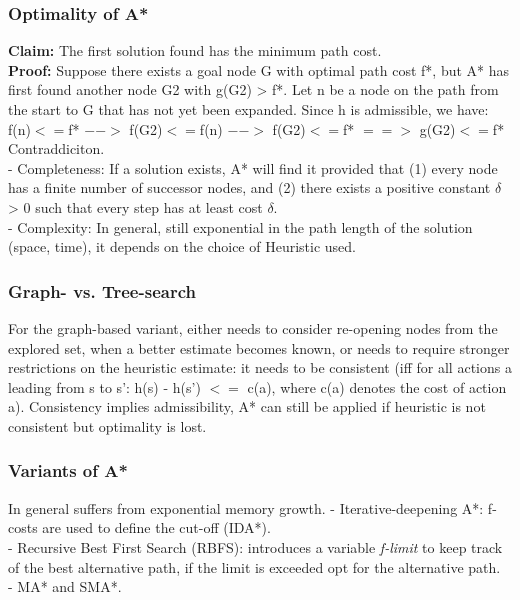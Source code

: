 \documentclass{article}
\begin{document}
\subsubsection{Optimality of A*}
\textbf{Claim: }The first solution found has the minimum path cost.\\
\textbf{Proof: }Suppose there exists a goal node G with optimal path cost f*, but
A* has first found another node G2 with g(G2) > f*. Let n be a node on the path from the start to G that has not yet been expanded. Since h is admissible, we have: f(n)$<=$f* $-->$ f(G2)$<=$f(n) $-->$ f(G2)$<=$f* $==>$ g(G2)$<=$f* Contraddiciton.\\
- Completeness: If a solution exists, A* will find it provided that (1) every node has a finite number of successor nodes, and (2) there exists a positive constant $\delta$ > 0 such that every step has at least cost $\delta$.\\
- Complexity: In general, still exponential in the path length of the solution (space, time), it depends on the choice of Heuristic used.
\subsubsection{Graph- vs. Tree-search}
For the graph-based variant, either needs to consider re-opening nodes from the explored set, when a better estimate becomes known, or needs to require stronger restrictions on the heuristic estimate: it needs to be consistent (iff for all actions a leading from s to s': h(s) - h(s') $<=$ c(a), where c(a) denotes the cost of action a). Consistency implies admissibility, A* can still be applied if heuristic is not consistent but optimality is lost.
\subsubsection{Variants of A*}
In general suffers from exponential memory growth.
- Iterative-deepening A*: f-costs are used to define the cut-off (IDA*).\\
- Recursive Best First Search (RBFS): introduces a variable \textit{f-limit} to
keep track of the best alternative path, if the limit is exceeded opt for the alternative path.\\
- MA* and SMA*.
\end{document}

